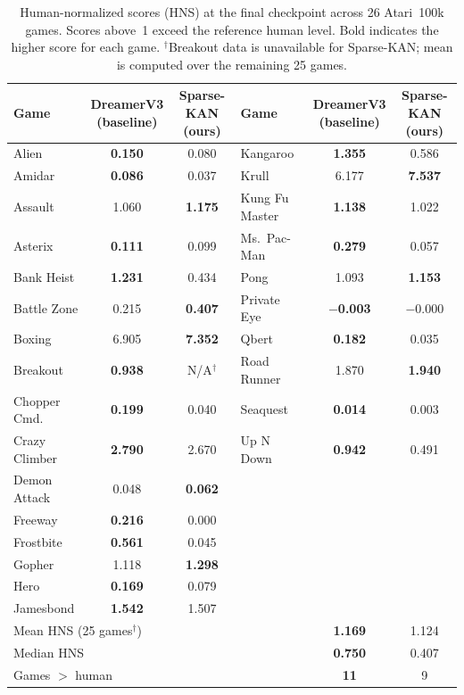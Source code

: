 \documentclass[11pt, a4paper]{article}
\begin{document}
\begin{table}[ht]
\centering
\caption{Human-normalized scores (HNS) at the final checkpoint across 26 Atari~100k games.
  Scores above~1 exceed the reference human level.
  Bold indicates the higher score for each game.
  $^\dagger$Breakout data is unavailable for Sparse-KAN; mean is computed over the remaining 25 games.}
\label{tab:per_game}
\setlength{\tabcolsep}{5pt}
\begin{tabular}{lcc|lcc}
\toprule
Game & \shortstack{DreamerV3\\(baseline)} & \shortstack{Sparse-KAN\\(ours)}
   & Game & \shortstack{DreamerV3\\(baseline)} & \shortstack{Sparse-KAN\\(ours)} \\
\midrule
Alien          & \textbf{0.150} & 0.080 & Kangaroo       & \textbf{1.355} & 0.586 \\
Amidar         & \textbf{0.086} & 0.037 & Krull          & 6.177 & \textbf{7.537} \\
Assault        & 1.060 & \textbf{1.175} & Kung Fu Master & \textbf{1.138} & 1.022 \\
Asterix        & \textbf{0.111} & 0.099 & Ms.\ Pac-Man   & \textbf{0.279} & 0.057 \\
Bank Heist     & \textbf{1.231} & 0.434 & Pong           & 1.093 & \textbf{1.153} \\
Battle Zone    & 0.215 & \textbf{0.407} & Private Eye    & \textbf{$-$0.003} & $-$0.000 \\
Boxing         & 6.905 & \textbf{7.352} & Qbert          & \textbf{0.182} & 0.035 \\
Breakout       & \textbf{0.938} & N/A$^\dagger$ & Road Runner    & 1.870 & \textbf{1.940} \\
Chopper Cmd.   & \textbf{0.199} & 0.040 & Seaquest       & \textbf{0.014} & 0.003 \\
Crazy Climber  & \textbf{2.790} & 2.670 & Up N Down      & \textbf{0.942} & 0.491 \\
Demon Attack   & 0.048 & \textbf{0.062} & & & \\
Freeway        & \textbf{0.216} & 0.000 & & & \\
Frostbite      & \textbf{0.561} & 0.045 & & & \\
Gopher         & 1.118 & \textbf{1.298} & & & \\
Hero           & \textbf{0.169} & 0.079 & & & \\
Jamesbond      & \textbf{1.542} & 1.507 & & & \\
\midrule
\multicolumn{4}{l}{Mean HNS (25 games$^\dagger$)}   & \textbf{1.169} & 1.124 \\
\multicolumn{4}{l}{Median HNS} & \textbf{0.750} & 0.407 \\
\multicolumn{4}{l}{Games $>$ human} & \textbf{11} & 9 \\
\bottomrule
\end{tabular}
\end{table}
\end{document}
